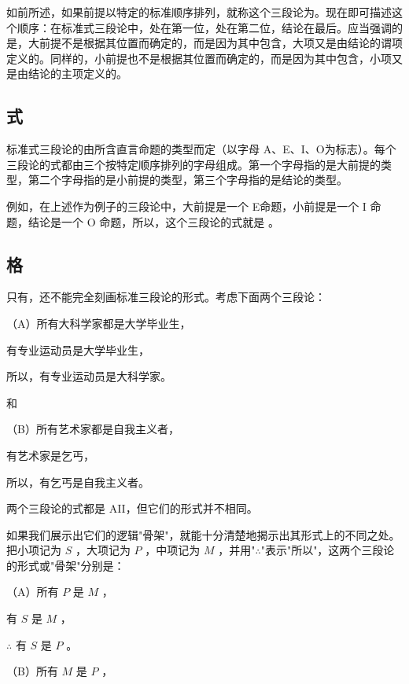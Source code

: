 如前所述，如果前提以特定的标准顺序排列，就称这个三段论为。现在即可描述这个顺序：在标准式三段论中，处在第一位，处在第二位，结论在最后。应当强调的是，大前提不是根据其位置而确定的，而是因为其中包含，大项又是由结论的谓项定义的。同样的，小前提也不是根据其位置而确定的，而是因为其中包含，小项又是由结论的主项定义的。

\subsection{式}
\begin{theorembox}[title=三段论的式]
标准式三段论的由所含直言命题的类型而定（以字母 A、E、I、O为标志）。每个三段论的式都由三个按特定顺序排列的字母组成。第一个字母指的是大前提的类型，第二个字母指的是小前提的类型，第三个字母指的是结论的类型。
\end{theorembox}

例如，在上述作为例子的三段论中，大前提是一个 E命题，小前提是一个 I 命题，结论是一个 O 命题，所以，这个三段论的式就是 。

\subsection{格}
只有，还不能完全刻画标准三段论的形式。考虑下面两个三段论：

\begin{examplebox}[title=相同式但不同格的三段论]
（A）所有大科学家都是大学毕业生，

有专业运动员是大学毕业生，

所以，有专业运动员是大科学家。

和

（B）所有艺术家都是自我主义者，

有艺术家是乞丐，

所以，有乞丐是自我主义者。

两个三段论的式都是 AII，但它们的形式并不相同。
\end{examplebox}

如果我们展示出它们的逻辑"骨架"，就能十分清楚地揭示出其形式上的不同之处。把小项记为 $S$ ，大项记为 $P$ ，中项记为 $M$ ，并用"$\therefore$"表示"所以"，这两个三段论的形式或"骨架"分别是：

（A）所有 $P$ 是 $M$ ，

有 $S$ 是 $M$ ，

$\therefore$ 有 $S$ 是 $P$ 。

（B）所有 $M$ 是 $P$ ，

